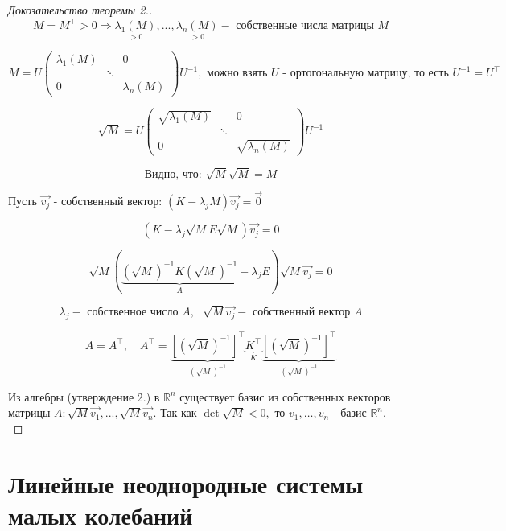 \documentclass[12pt, a4paper]{report}
\begin{document}
\fi


\begin{proof}[Докозательство теоремы 2.]
    \[  \] 
    \[ M = M ^{ \top } > 0 \Rightarrow \underset{>0}{\lambda_1 (M )},..., \underset{>0}{\lambda_n (M )} - \text{ собственные числа матрицы }  M \] 

    \[ M = U \begin{pmatrix}
    \lambda_1 (M) &  & 0\\
     & \ddots & \\
    0 &  & \lambda_n(M)
    \end{pmatrix} U^{-1} , \text{ можно взять } U \text{ - ортогональную матрицу, то есть } U^{ -1} = U^{\top}    \] 


\[ \sqrt{M} = U \begin{pmatrix}
    \sqrt{\lambda_1 (M)} &  & 0\\
     & \ddots & \\
    0 &  & \sqrt{\lambda_n(M)}
    \end{pmatrix}  U^{-1} \] 

    \[ \text{Видно, что: } \sqrt{M} \sqrt{M}  =M\]

    Пусть \( \vec{v_j}   \) - собственный вектор: \( (K- \lambda_j M ) \vec{v_j } =\vec{0}   \) 

    \[ (K - \lambda_j \sqrt{M } E \sqrt{M }) \vec{v_j} = 0 \] 

    \[ \sqrt{M } (\underbrace{(\sqrt{M })^{-1} K (\sqrt{M})^{-1}}_{A} - \lambda_j E   ) \sqrt{M } \vec{v_j} = 0 \] 

    \[ \lambda_j - \text{ собственное число } A , \text{ }  \sqrt{ M } \vec{v_j } -\text{ собственный вектор  }  A \] 

    \[ A= A^{\top} , \quad  A^{\top } =\underbrace{ [(\sqrt{M } )^{-1} ]^{\top }}_{(\sqrt{M })^{-1} } \underbrace{K^{\top }}_{K} \underbrace{ [(\sqrt{M } )^{-1} ]^{\top }}_{(\sqrt{M })^{-1} }    \] 

    Из алгебры (утверждение 2.) в \( \mathbb{R}     ^{ n }  \) существует базис из собственных векторов матрицы \( A : \sqrt{M }\vec{v_1 },..., \sqrt{M } \vec{v_n}    \). Так как \( \det \sqrt{M }<0 ,  \)  то \( v_1, \ldots, v_n \) - базис \( \mathbb{R} ^n  \). 
    \[  \] 
\end{proof}
 

\section{Линейные неоднородные системы  малых колебаний}
\end{document}
